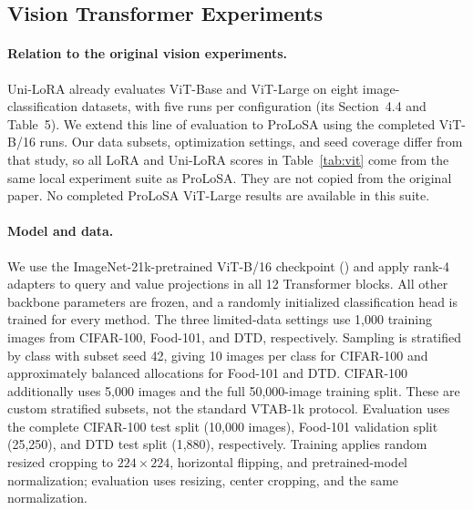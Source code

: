 \subsection{Vision Transformer Experiments}
\label{app:vit}

\paragraph{Relation to the original vision experiments.}
Uni-LoRA \citep{li2025unilora} already evaluates ViT-Base and ViT-Large on eight image-classification datasets, with five runs per configuration (its Section~4.4 and Table~5). We extend this line of evaluation to ProLoSA using the completed ViT-B/16 runs. Our data subsets, optimization settings, and seed coverage differ from that study, so all LoRA and Uni-LoRA scores in Table~\ref{tab:vit} come from the same local experiment suite as ProLoSA. They are not copied from the original paper. No completed ProLoSA ViT-Large results are available in this suite.

\paragraph{Model and data.}
We use the ImageNet-21k-pretrained ViT-B/16 checkpoint () and apply rank-4 adapters to query and value projections in all 12 Transformer blocks. All other backbone parameters are frozen, and a randomly initialized classification head is trained for every method. The three limited-data settings use 1,000 training images from CIFAR-100, Food-101, and DTD, respectively. Sampling is stratified by class with subset seed 42, giving 10 images per class for CIFAR-100 and approximately balanced allocations for Food-101 and DTD. CIFAR-100 additionally uses 5,000 images and the full 50,000-image training split. These are custom stratified subsets, not the standard VTAB-1k protocol. Evaluation uses the complete CIFAR-100 test split (10,000 images), Food-101 validation split (25,250), and DTD test split (1,880), respectively. Training applies random resized cropping to $224\times224$, horizontal flipping, and pretrained-model normalization; evaluation uses resizing, center cropping, and the same normalization.

